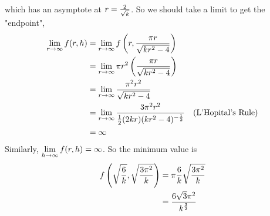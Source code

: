 \documentclass[english, 11pt]{article}
\begin{document}
\begin{exmp}
\begin{itemize}
    which has an asymptote at $r = \frac{2}{\sqrt{k}}$. So we should take a limit to get the "endpoint",
    \begin{align*}
       \lim_{r \rightarrow \infty} f(r,h) & = \lim_{r \rightarrow \infty} f \left( r, \frac{\pi r}{\sqrt{kr^2 - 4}} \right) \\
       & = \lim_{r \rightarrow \infty}\pi r^2 \left( \frac{\pi r}{\sqrt{kr^2 - 4}} \right) \\
       & = \lim_{r \rightarrow \infty} \frac{\pi^2 r^2}{\sqrt{kr^2 - 4}} \\
       & = \lim_{r \rightarrow \infty} \frac{3\pi^2 r^2}{\frac{1}{2} (2kr) (kr^2 - 4)^{-\frac{1}{2}}} & \mbox{(L'Hopital's Rule)} \\
       & = \infty
     \end{align*}
     Similarly, $\displaystyle \lim_{h \rightarrow \infty} f(r,h) = \infty$. So the minimum value is
     \begin{align*}
       f\left(  \sqrt{\frac{6}{k}},  \sqrt{\frac{3\pi^2}{k}} \right) & = \pi \frac{6}{k} \sqrt{\frac{3\pi^2}{k}} \\ & = \frac{6\sqrt{3}\pi^2}{k^{\frac{3}{2}}}
     \end{align*}
  \end{itemize}
\end{exmp}
\end{document}
